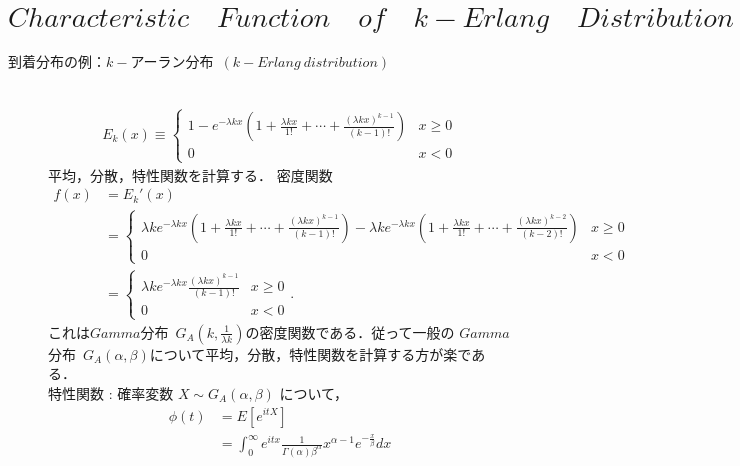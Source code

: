 \documentclass[a4j,papersize,disablejfam,slide,14pt]{jsarticle}
\def\exp#1{e^{#1}} %
\begin{document}
\section{$Characteristic\quad Function\quad of\quad k-Erlang\quad Distribution$}
\label{sec:appendix_erlang}
	\begin{description}
    	\item[到着分布の例：$k-$アーラン分布\ $(k-Erlang\ distribution)$]\mbox{}\\
    		\begin{align}
    			E_k(x) \equiv
        		\begin{cases}
        			1 - \exp{-\lambda k x} \left( 1 + \frac{\lambda k x}{1!} + \cdots + \frac{(\lambda k x)^{k-1}}{(k-1)!} \right) & \text{$x \geq 0$}\\
    				0 & \text{$x < 0$}
        		\end{cases}
    		\end{align}
        平均，分散，特性関数を計算する．
        密度関数
        \begin{align}
            f(x) &= E_k'(x) \\&= 
            \begin{cases}
        			\lambda k \exp{-\lambda k x} \left( 1 + \frac{\lambda k x}{1!} + \cdots + \frac{(\lambda k x)^{k-1}}{(k-1)!} \right)
                    - \lambda k \exp{-\lambda k x} \left( 1 + \frac{\lambda k x}{1!} + \cdots + \frac{(\lambda k x)^{k-2}}{(k-2)!} \right) & \text{$x \geq 0$}\\
    				0 & \text{$x < 0$}
        	\end{cases} 
            \\&=
            \begin{cases}
        			\lambda k \exp{-\lambda k x} \frac{(\lambda k x)^{k-1}}{(k-1)!} & \text{$x \geq 0$}\\
    				0 & \text{$x < 0$}
        	\end{cases}.
        \end{align}
        これは$Gamma$分布\ $G_A(k, \frac{1}{\lambda k})$の密度関数である．従って一般の
        $Gamma$分布\ $G_A(\alpha, \beta)$について平均，分散，特性関数を計算する方が楽である．\\
        特性関数 : 確率変数 $X \sim G_A(\alpha, \beta)$ について，
        \begin{align}
			\phi(t) &= E[e^{itX}] \\
			&= \int_{0}^{\infty} e^{itx} \frac{1}{\Gamma(\alpha)\beta^\alpha} x^{\alpha-1} e^{-\frac{x}{\beta}} dx \\

\end{align}
\end{description}
\end{document}
